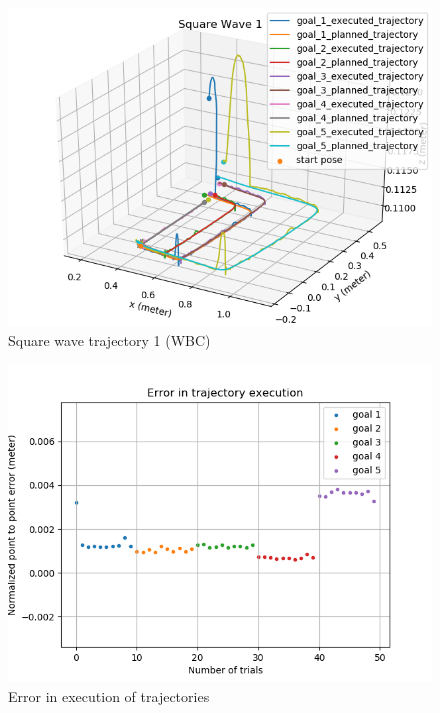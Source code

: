 \begin{figure}[H]
	\centering
	\includegraphics[scale=0.75]{images/2/square.png}
	\caption{Square wave trajectory 1 (WBC)}
	\label{fig:square_wbc}
\end{figure}


\begin{figure}[H]
	\centering
	\includegraphics[scale=0.65]{images/2/square_e.png}
	\caption{Error in execution of trajectories}
	\label{fig:square_wbc_e}
\end{figure}

